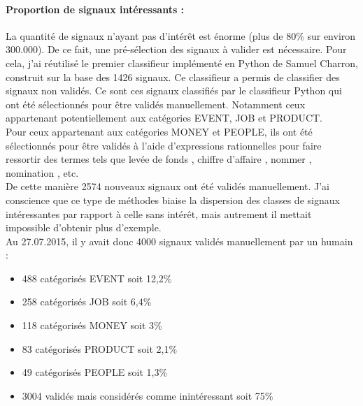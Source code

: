                 \paragraph{Proportion de signaux intéressants :}
                    La quantité de signaux n'ayant pas d'intérêt est énorme (plus de 80\% sur environ 300.000). De ce fait, une pré-sélection des signaux à valider est nécessaire. Pour cela, j'ai réutilisé le premier classifieur implémenté en Python de Samuel Charron, construit sur la base des 1426 signaux. Ce classifieur a permis de classifier des signaux non validés. Ce sont ces signaux classifiés par le classifieur Python qui ont été sélectionnés pour être validés manuellement. Notamment ceux appartenant potentiellement aux catégories EVENT, JOB et PRODUCT.\\
                    Pour ceux appartenant aux catégories MONEY et PEOPLE, ils ont été sélectionnés pour être validés à l'aide d'expressions rationnelles pour faire ressortir des termes tels que \og levée de fonds \fg, \og chiffre d'affaire \fg, \og nommer \fg, \og nomination \fg, etc.\\
                    De cette manière 2574 nouveaux signaux ont été validés manuellement. J'ai conscience que ce type de méthodes biaise la dispersion des classes de signaux intéressantes par rapport à celle sans intérêt, mais autrement il mettait impossible d'obtenir plus d'exemple.\\

                    Au 27.07.2015, il y avait donc 4000 signaux validés manuellement par un humain :
                    \begin{itemize}
                        \item 488 catégorisés EVENT soit 12,2\%
                        \item 258 catégorisés JOB soit 6,4\%
                        \item 118 catégorisés MONEY soit 3\%
                        \item 83 catégorisés PRODUCT soit 2,1\%
                        \item 49 catégorisés PEOPLE soit 1,3\%
                        \item 3004 validés mais considérés comme inintéressant soit 75\%
                    \end{itemize}

